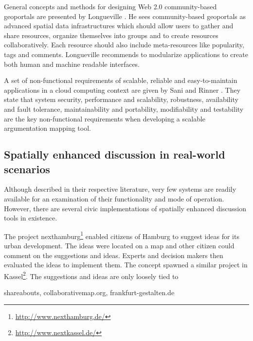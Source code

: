 General concepts and methods for designing Web 2.0 community-based geoportals are presented by Longueville \cite{Longueville2010_community_based_geoportals_web20}. He sees community-based geoportals as advanced spatial data infrastructures which should allow users to gather and share resources, organize themselves into groups and to create resources collaboratively. Each resource should also include meta-resources like popularity, tags and comments. Longueville recommends to modularize applications to create both human and machine readable interfaces.

A set of non-functional requirements of scalable, reliable and easy-to-maintain applications in a cloud computing context are given by Sani and Rinner \cite{Sani2011_Scalable_Argumap}. They state that system security, performance and scalability, robustness, availability and fault tolerance, maintainability and portability, modifiability and testability are the key non-functional requirements when developing a scalable argumentation mapping tool. 


\subsection{Spatially enhanced discussion in real-world scenarios}

Although described in their respective literature, very few systems are readily available for an examination of their functionality and mode of operation. However, there are several civic implementations of spatially enhanced discussion tools in existence.

The project nexthamburg\footnote{\url{http://www.nexthamburg.de/}} enabled citizens of Hamburg to suggest ideas for its urban development. The ideas were located on a map and other citizen could comment on the suggestions and ideas. Experts and decision makers then evaluated the ideas to implement them. The concept spawned a similar project in Kassel\footnote{\url{http://www.nextkassel.de/}}. The suggestions and ideas are only loosely tied to 



\cite{Kulus_nexthamburg}

 shareabouts, collaborativemap.org, frankfurt-gestalten.de


